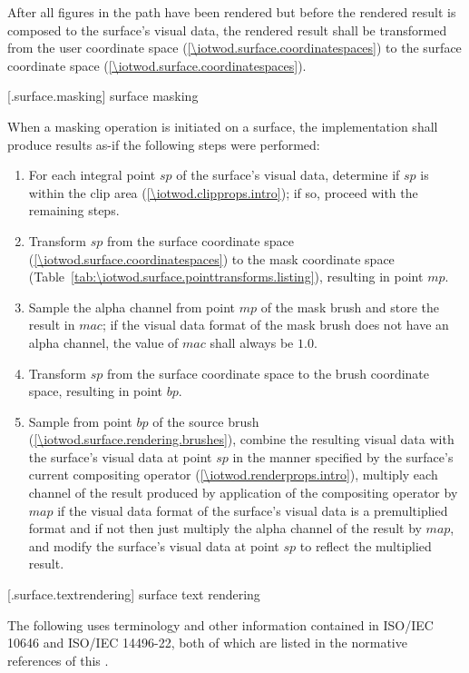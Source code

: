 \pnum
After all figures in the path have been rendered but before the rendered result is composed to the surface's visual data, the rendered result shall be transformed from the user coordinate space (\ref{\iotwod.surface.coordinatespaces}) to the surface coordinate space (\ref{\iotwod.surface.coordinatespaces}).

 [\iotwod.surface.masking] {surface masking}

\pnum
When a masking operation is initiated on a surface, the implementation shall produce results as-if the following steps were performed:

\begin{enumerate}
\item For each integral point $sp$ of the surface's visual data, determine if $sp$ is within the clip area (\ref{\iotwod.clipprops.intro}); if so, proceed with the remaining steps.
\item Transform $sp$ from the surface coordinate space (\ref{\iotwod.surface.coordinatespaces}) to the mask coordinate space (Table~\ref{tab:\iotwod.surface.pointtransforms.listing}), resulting in point $mp$.
\item Sample the alpha channel from point $mp$ of the mask brush and store the result in $mac$; if the visual data format of the mask brush does not have an alpha channel, the value of $mac$ shall always be $1.0$.
\item Transform $sp$ from the surface coordinate space to the brush coordinate space, resulting in point $bp$.
\item Sample from point $bp$ of the source brush (\ref{\iotwod.surface.rendering.brushes}), combine the resulting visual data with the surface's visual data at point $sp$ in the manner specified by the surface's current compositing operator (\ref{\iotwod.renderprops.intro}), multiply each channel of the result produced by application of the compositing operator by $map$ if the visual data format of the surface's visual data is a premultiplied format and if not then just multiply the alpha channel of the result by $map$, and modify the surface's visual data at point $sp$ to reflect the multiplied result.
\end{enumerate}

 [\iotwod.surface.textrendering] {surface text rendering}
\pnum
\begin{note}
The following uses terminology and other information contained in ISO/IEC 10646 and ISO/IEC 14496-22, both of which are listed in the normative references of this \documenttypename{}. 
\end{note}

